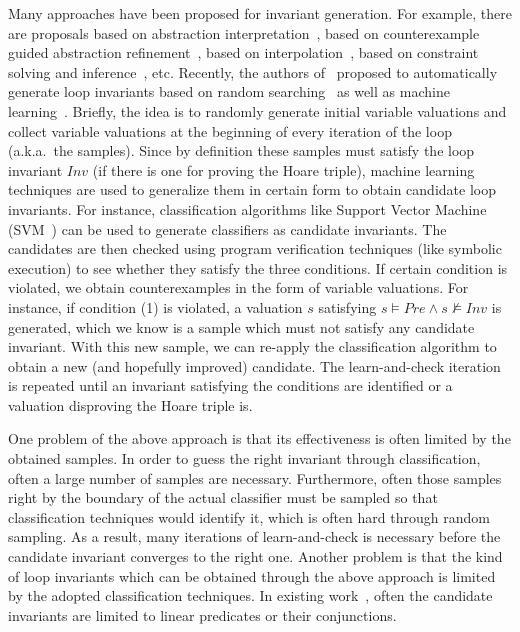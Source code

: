 Many approaches have been proposed for invariant generation. For example, there are proposals based on abstraction interpretation~\cite{cousot1978automatic,mine2006octagon,cousot1979systematic,karr1976affine,vincent2009subpolyhedra}, based on counterexample guided abstraction refinement~\cite{henzinger2003software,thomas2001slam,edmund2003counterexample}, based on interpolation~\cite{kenneth2010lazy,thomas2004abstractions,kenneth2003interpolation,Kenneth2006lazy}, based on constraint solving and inference~\cite{ashutosh2009invgen,michael2003linear,sumit2009constraint}, etc. Recently, the authors of~\cite{sharma2012interpolants,sharma2013verification,sharma2014invariant} proposed to automatically generate loop invariants based on random searching~\cite{sharma2014invariant} as well as machine learning~\cite{sharma2012interpolants}. Briefly, the idea is to randomly generate initial variable valuations and collect variable valuations at the beginning of every iteration of the loop (a.k.a.~the samples). Since by definition these samples must satisfy the loop invariant $Inv$ (if there is one for proving the Hoare triple), machine learning techniques are used to generalize them in certain form to obtain candidate loop invariants. For instance, classification algorithms like Support Vector Machine (SVM~\cite{sharma2012interpolants,sharma2013verification}) can be used to generate classifiers as candidate invariants. The candidates are then checked using program verification techniques (like symbolic execution) to see whether they satisfy the three conditions. If certain condition is violated, we obtain counterexamples in the form of variable valuations. For instance, if condition (1) is violated, a valuation $s$ satisfying $s \models Pre \land s \not \models Inv$ is generated, which we know is a sample which must not satisfy any candidate invariant. With this new sample, we can re-apply the classification algorithm to obtain a new (and hopefully improved) candidate. The learn-and-check iteration is repeated until an invariant satisfying the conditions are identified or a valuation disproving the Hoare triple is.

One problem of the above approach is that its effectiveness is often limited by the obtained samples. In order to guess the right invariant through classification, often a large number of samples are necessary. Furthermore, often those samples right by the boundary of the actual classifier must be sampled so that classification techniques would identify it, which is often hard through random sampling. As a result, many iterations of learn-and-check is  necessary before the candidate invariant converges to the right one. Another problem is that the kind of loop invariants which can be obtained through the above approach is limited by the adopted classification techniques. In existing work~\cite{sharma2012interpolants,sharma2013verification,sharma2014invariant}, often the candidate invariants are limited to linear predicates or their conjunctions.

